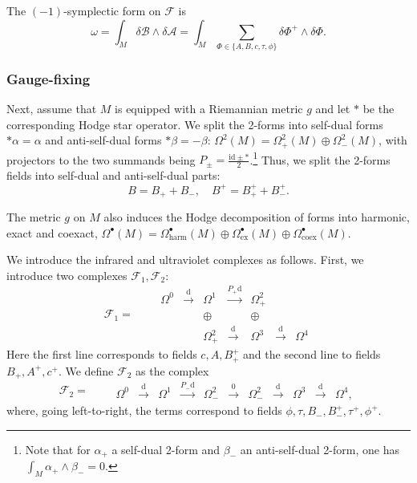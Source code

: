 \documentclass{amsart}
\theoremstyle{plain} %
\theoremstyle{definition}
\theoremstyle{remark}
\newcommand{\mr}{\mathrm}
\newcommand{\bt}{\bullet}
\newcommand{\F}{\mathcal{F}}
\newcommand{\xra}{\xrightarrow}
\newcommand{\A}{\mathcal{A}}
\newcommand{\B}{\mathcal{B}}
\newcommand{\dr}{\mathrm{d}}
\begin{document}
The $(-1)$-symplectic form on $\F$ is 
\begin{equation}
    \omega=\int_M \delta \B\wedge \delta \A = \int_M \sum_{\Phi\in \{A,B,c,\tau,\phi\}}\delta \Phi^+\wedge \delta \Phi.
\end{equation}

\subsubsection{Gauge-fixing}
Next, assume that $M$ is equipped with a Riemannian metric $g$ and let $*$ be the corresponding Hodge star operator. We split the 2-forms into self-dual forms $*\alpha=\alpha$ and anti-self-dual forms $*\beta=-\beta$: $\Omega^2(M)=\Omega^2_+(M)\oplus \Omega^2_-(M)$, with projectors to the two summands being $P_\pm=\frac{\mr{id}\pm *}{2}$.\footnote{Note that for $\alpha_+$ a self-dual 2-form and $\beta_-$ an anti-self-dual 2-form, one has $\int_M \alpha_+\wedge \beta_-=0$.}
Thus, we split the 2-forms fields into self-dual and anti-self-dual parts:
\begin{equation}
    B=B_++ B_-,\quad B^+=B_+^++B_-^+.
\end{equation}

The metric $g$ on $M$ also induces the Hodge decomposition of forms into harmonic, exact and coexact, $\Omega^\bt(M)=\Omega_\mr{harm}^\bt(M)\oplus \Omega_\mr{ex}^\bt(M)\oplus \Omega_\mr{coex}^\bt(M)$.

We introduce the infrared and ultraviolet complexes as follows.
First, we introduce two complexes $\F_1,\F_2$:
\begin{equation}
    \F_1=\qquad \begin{array}{ccccccc}
         \Omega^0& \xra{\dr}& \Omega^1 &\xra{P_+\dr}& \Omega^2_+ &&  \\
         &&\oplus&&\oplus&& \\
         && \Omega^2_+&\xra{\dr}& \Omega^3 &\xra{\dr}& \Omega^4
    \end{array}
\end{equation}
Here the first line corresponds to fields $c,A,B^+_+$ and the second line to fields $B_+,A^+,c^+$. We define $\F_2$ as the complex
\begin{equation}
    \F_2=\qquad 
    \begin{array}{ccccccccccc}
         \Omega^0 &\xra{\dr} &\Omega^1 &\xra{P_- \dr}& \Omega^2_- &\xra{0}& \Omega^2_-& \xra{\dr} &\Omega^3 &\xra{\dr} &\Omega^4, 
    \end{array}
\end{equation}
where, going left-to-right, the terms correspond to fields $\phi,\tau,B_-,B_-^+,\tau^+,\phi^+$.
\end{document}
